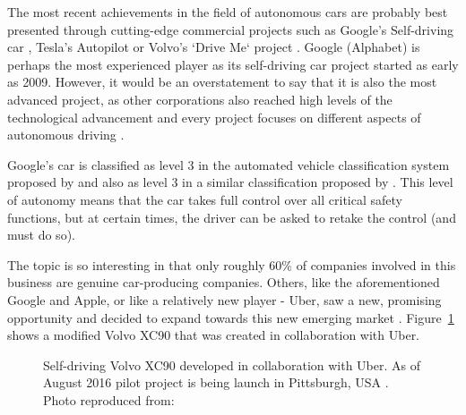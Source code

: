 \documentclass[11pt,english]{article}
\begin{document}
The most recent achievements in the field of autonomous cars are probably best presented through cutting-edge commercial projects such as Google's Self-driving car \citep{google1}, Tesla's Autopilot \citep{tesla1} or Volvo's `Drive Me` project \citep{volvo1}. Google (Alphabet) is perhaps the most experienced player as its self-driving car project started as early as 2009. However, it would be an overstatement to say that it is also the most advanced project, as other corporations also reached high levels of the technological advancement and every project focuses on different aspects of autonomous driving \citep{33comp}. 
\par
Google's car is classified as level 3 in the automated vehicle classification system proposed by \citet{nhtsa1} and also as level 3 in a similar classification proposed by \citet{sae1}. This level of autonomy means that the car takes full control over all critical safety functions, but at certain times, the driver can be asked to retake the control (and must do so).  
\par
The topic is so interesting in that only roughly 60\% of companies involved in this business are genuine car-producing companies. Others, like the aforementioned Google and Apple, or like a relatively new player  - Uber, saw a new, promising opportunity and decided to expand towards this new emerging market \citep{33comp}. Figure~\ref{fig:volvo} shows a modified Volvo XC90 that was created in collaboration with Uber.

\begin{figure}[!] %
\caption{Self-driving Volvo XC90 developed in collaboration with Uber. As of August 2016 pilot project is being launch in Pittsburgh, USA \citep{uberpittsburgh}. Photo reproduced from: \citet{volvo1}}
\label{fig:volvo}
\end{figure} 
\end{document}
